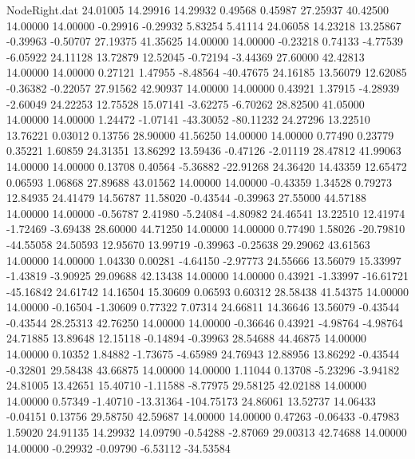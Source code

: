 \begin{filecontents}{NodeRight.dat}
  24.01005   14.29916   14.29932     0.49568    0.45987   27.25937   40.42500   14.00000   14.00000   -0.29916   -0.29932    5.83254    5.41114
  24.06058   14.23218   13.25867    -0.39963   -0.50707   27.19375   41.35625   14.00000   14.00000   -0.23218    0.74133   -4.77539   -6.05922
  24.11128   13.72879   12.52045    -0.72194   -3.44369   27.60000   42.42813   14.00000   14.00000    0.27121    1.47955   -8.48564  -40.47675
  24.16185   13.56079   12.62085    -0.36382   -0.22057   27.91562   42.90937   14.00000   14.00000    0.43921    1.37915   -4.28939   -2.60049
  24.22253   12.75528   15.07141    -3.62275   -6.70262   28.82500   41.05000   14.00000   14.00000    1.24472   -1.07141  -43.30052  -80.11232
  24.27296   13.22510   13.76221     0.03012    0.13756   28.90000   41.56250   14.00000   14.00000    0.77490    0.23779    0.35221    1.60859
  24.31351   13.86292   13.59436    -0.47126   -2.01119   28.47812   41.99063   14.00000   14.00000    0.13708    0.40564   -5.36882  -22.91268
  24.36420   14.43359   12.65472     0.06593    1.06868   27.89688   43.01562   14.00000   14.00000   -0.43359    1.34528    0.79273   12.84935
  24.41479   14.56787   11.58020    -0.43544   -0.39963   27.55000   44.57188   14.00000   14.00000   -0.56787    2.41980   -5.24084   -4.80982
  24.46541   13.22510   12.41974    -1.72469   -3.69438   28.60000   44.71250   14.00000   14.00000    0.77490    1.58026  -20.79810  -44.55058
  24.50593   12.95670   13.99719    -0.39963   -0.25638   29.29062   43.61563   14.00000   14.00000    1.04330    0.00281   -4.64150   -2.97773
  24.55666   13.56079   15.33997    -1.43819   -3.90925   29.09688   42.13438   14.00000   14.00000    0.43921   -1.33997  -16.61721  -45.16842
  24.61742   14.16504   15.30609     0.06593    0.60312   28.58438   41.54375   14.00000   14.00000   -0.16504   -1.30609    0.77322    7.07314
  24.66811   14.36646   13.56079    -0.43544   -0.43544   28.25313   42.76250   14.00000   14.00000   -0.36646    0.43921   -4.98764   -4.98764
  24.71885   13.89648   12.15118    -0.14894   -0.39963   28.54688   44.46875   14.00000   14.00000    0.10352    1.84882   -1.73675   -4.65989
  24.76943   12.88956   13.86292    -0.43544   -0.32801   29.58438   43.66875   14.00000   14.00000    1.11044    0.13708   -5.23296   -3.94182
  24.81005   13.42651   15.40710    -1.11588   -8.77975   29.58125   42.02188   14.00000   14.00000    0.57349   -1.40710  -13.31364 -104.75173
  24.86061   13.52737   14.06433    -0.04151    0.13756   29.58750   42.59687   14.00000   14.00000    0.47263   -0.06433   -0.47983    1.59020
  24.91135   14.29932   14.09790    -0.54288   -2.87069   29.00313   42.74688   14.00000   14.00000   -0.29932   -0.09790   -6.53112  -34.53584

\end{filecontents}
